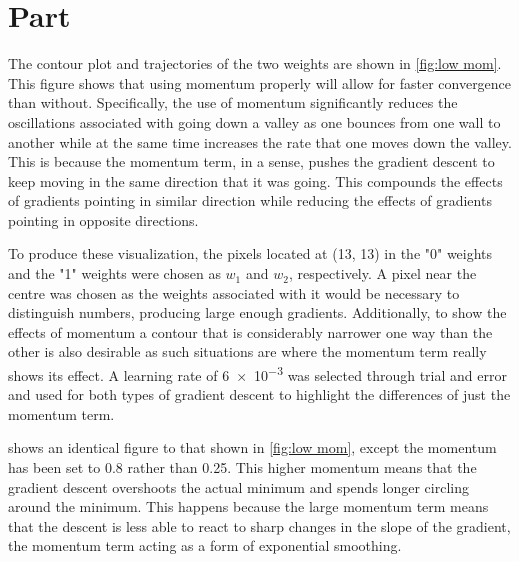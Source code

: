 \documentclass{article}
\newcommand{\enterproblemHeader}[1]{
}
\newcommand{\exitproblemHeader}[1]{
}
\newcounter{problem} %
\newcommand{\problemName}{}
\newenvironment{problem}[1][Part \theproblem]{ %
	\stepcounter{problem} %
	\renewcommand{\problemName}{#1} %
	\section{\problemName} %
	\enterproblemHeader{\problemName} %
}{
	\exitproblemHeader{\problemName} %
}
\begin{document}
\FloatBarrier
\begin{problem}
	The contour plot and trajectories of the two weights are shown in \cref{fig:low mom}. This figure shows that using momentum properly will allow for faster convergence than without. Specifically, the use of momentum significantly reduces the oscillations associated with going down a valley as one bounces from one wall to another while at the same time increases the rate that one moves down the valley. This is because the momentum term, in a sense, pushes the gradient descent to keep moving in the same direction that it was going. This compounds the effects of gradients pointing in similar direction while reducing the effects of gradients pointing in opposite directions. 
	
	To produce these visualization, the pixels located at (13, 13) in the "0" weights and the "1" weights were chosen as \(w_1\) and \(w_2\), respectively. A pixel near the centre was chosen as the weights associated with it would be necessary to distinguish numbers, producing large enough gradients. Additionally, to show the effects of momentum a contour that is considerably narrower one way than the other is also desirable as such situations are where the momentum term really shows its effect. A learning rate of \num{6e-3} was selected through trial and error and used for both types of gradient descent to highlight the differences of just the momentum term.
	
	 shows an identical figure to that shown in \cref{fig:low mom}, except the momentum has been set to 0.8 rather than 0.25. This higher momentum means that the gradient descent overshoots the actual minimum and spends longer circling around the minimum. This happens because the large momentum term means that the descent is less able to react to sharp changes in the slope of the gradient, the momentum term acting as a form of exponential smoothing.
	

\end{problem}
\end{document}
